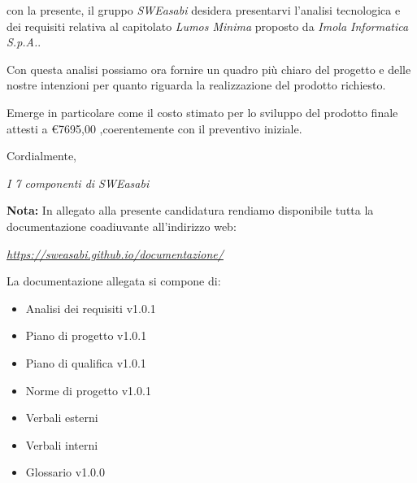 \documentclass{article}
\begin{document}
con la presente, il gruppo \textit{SWEasabi} desidera presentarvi l'analisi tecnologica e dei requisiti relativa al capitolato \textit{Lumos Minima} proposto da \textit{Imola Informatica S.p.A.}.

Con questa analisi possiamo ora fornire un quadro più chiaro del progetto e delle nostre intenzioni per quanto riguarda la realizzazione del prodotto richiesto.

Emerge in particolare come il costo stimato per lo sviluppo del prodotto finale attesti a €7695,00 ,coerentemente con il preventivo iniziale.

Cordialmente,

\begin{flushright}
\textit{I 7 componenti di SWEasabi}
\end{flushright}

\textbf{Nota:} In allegato alla presente candidatura rendiamo disponibile tutta la documentazione coadiuvante all'indirizzo web:

\begin{center}
    \href{https://sweasabi.github.io/documentazione/}{\textit{https://sweasabi.github.io/documentazione/}}
\end{center}

La documentazione allegata si compone di:
\begin{itemize}
    \item Analisi dei requisiti v1.0.1
    \item Piano di progetto v1.0.1
    \item Piano di qualifica v1.0.1
    \item Norme di progetto v1.0.1
    \item Verbali esterni
    \item Verbali interni
    \item Glossario v1.0.0
\end{itemize}
\end{document}
